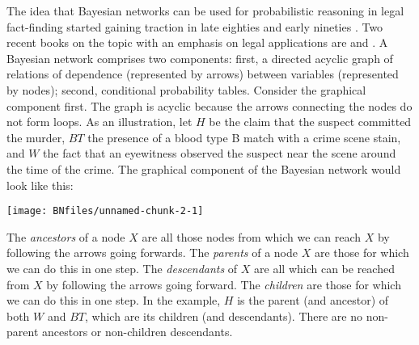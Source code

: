 \documentclass{article}
\begin{document}
The idea that Bayesian networks can be used for probabilistic reasoning in legal fact-finding started gaining traction in late eighties \citep{Friedman1986A-diagrammatic-} and early nineties
\citep{Edwards1991Influence-diagr}. Two recent books on the topic with an emphasis on legal applications are   \citep{Fenton2018Risk} and \citep{taroni2006bayesian}. 
%
A Bayesian network comprises two components: first, a directed acyclic graph of relations of dependence (represented by arrows) between variables (represented by nodes); second,  conditional probability tables. 
Consider the graphical component first. The graph is acyclic because the arrows connecting the nodes do not form loops. 
%
As an illustration,  let \(H\) be the claim that the suspect committed the murder, \(BT\) the presence of a blood type B match with a crime scene stain, and \(W\) the fact that an eyewitness observed the suspect near the scene around the time of the crime. The graphical component of the Bayesian network would look like this:
%
\begin{center}\texttt{[image: BNfiles/unnamed-chunk-2-1]} \end{center}
%
The \emph{ancestors} of a node \(X\) are all those nodes from
which we can reach \(X\) by following the arrows going forwards. The
\textit{parents} of a node \(X\) are those for which we can do this in one step.
The \textit{descendants} of \(X\) are all which can be reached from \(X\) by
following the arrows going forward. The \textit{children} are those for
which we can do this in one step. In the example,
$H$ is the parent (and ancestor) of both $ W$ and $BT$, which are its children (and descendants). There are no non-parent ancestors or non-children
descendants. %
\end{document}
